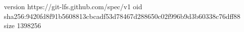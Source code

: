 version https://git-lfs.github.com/spec/v1
oid sha256:9420fd8f91b5608813cbcadf53d78467d288650c02f996b9d3b60338c76dff88
size 1398256

